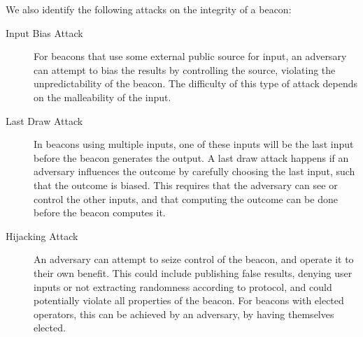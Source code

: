 \noindent%
We also identify the following attacks on the integrity of a beacon:

\begin{description}
    \item[Input Bias Attack]
For beacons that use some external public source for input, an adversary can attempt to bias the results by controlling the source, violating the unpredictability of the beacon.
The difficulty of this type of attack depends on the malleability of the input.
    \item[Last Draw Attack]
In beacons using multiple inputs, one of these inputs will be the last input before the beacon generates the output.
A last draw attack happens if an adversary influences the outcome by carefully choosing the last input, such that the outcome is biased.
This requires that the adversary can see or control the other inputs, and that computing the outcome can be done before the beacon computes it.
    \item[Hijacking Attack]
An adversary can attempt to seize control of the beacon, and operate it to their own benefit.
This could include publishing false results, denying user inputs or not extracting randomness according to protocol, and could potentially violate all properties of the beacon.
For beacons with elected operators, this can be achieved by an adversary, by having themselves elected.

\end{description}
